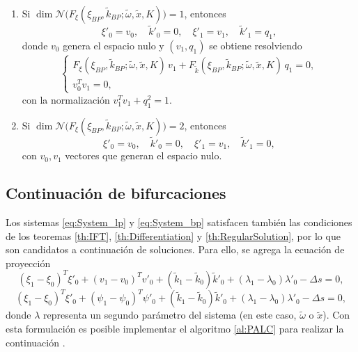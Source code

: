\begin{enumerate}
    \item Si $\dim \mathcal{N}\big(F_\xi(\xi_{BP}, \tilde{k}_{BP}; \tilde{\omega}, \tilde{x}, K)\big) = 1$, entonces
          \[
              \xi'_0 = v_0, \quad \tilde{k}'_0 = 0, \quad
              \xi'_1 = v_1, \quad \tilde{k}'_1 = q_1,
          \]
          donde $v_0$ genera el espacio nulo y $(v_1,q_1)$ se obtiene resolviendo
          \begin{equation}
              \begin{cases}
                  F_\xi(\xi_{BP}, \tilde{k}_{BP}; \tilde{\omega}, \tilde{x}, K)\, v_1
                  + F_{\tilde{k}}(\xi_{BP}, \tilde{k}_{BP}; \tilde{\omega}, \tilde{x}, K)\, q_1 = 0, \\[6pt]
                  v_0^T v_1 = 0,
              \end{cases}
          \end{equation}
          con la normalización $v_1^T v_1 + q_1^2 = 1$.

    \item Si $\dim \mathcal{N}\big(F_\xi(\xi_{BP}, \tilde{k}_{BP}; \tilde{\omega}, \tilde{x}, K)\big) = 2$, entonces
          \[
              \xi'_0 = v_0, \quad \tilde{k}'_0 = 0, \quad
              \xi'_1 = v_1, \quad \tilde{k}'_1 = 0,
          \]
          con $v_0, v_1$ vectores que generan el espacio nulo.
\end{enumerate}

\subsection{Continuación de bifurcaciones}

Los sistemas \eqref{eq:System_lp} y \eqref{eq:System_bp} satisfacen también las condiciones de los
teoremas \ref{th:IFT}, \ref{th:Differentiation} y \ref{th:RegularSolution}, por lo que son candidatos a continuación de soluciones. Para ello,
se agrega la ecuación de proyección
\begin{equation}
    (\xi_1 - \xi_0)^T \xi'_0 +
    (v_1 - v_0)^T v'_0 +
    (\tilde{k}_1 - \tilde{k}_0)\tilde{k}'_0 +
    (\lambda_1 - \lambda_0)\lambda'_0
    - \Delta s = 0,
\end{equation}
\begin{equation}
    (\xi_1 - \xi_0)^T \xi'_0 +
    (\psi_1 - \psi_0)^T \psi'_0 +
    (\tilde{k}_1 - \tilde{k}_0)\tilde{k}'_0 +
    (\lambda_1 - \lambda_0)\lambda'_0
    - \Delta s = 0,
\end{equation}
donde $\lambda$ representa un segundo parámetro del sistema (en este caso, $\tilde{\omega}$ o $\tilde{x}$).
Con esta formulación es posible implementar el algoritmo \ref{al:PALC} para realizar la continuación \cite{Meijer2011}.

